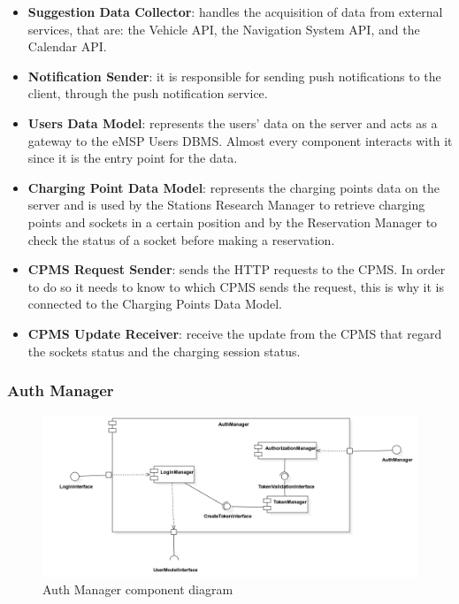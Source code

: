 \documentclass{Configuration_Files/PoliMi3i_thesis}
\begin{document}
\begin{itemize}
    \item \textbf{Suggestion Data Collector}: handles the acquisition of data from external services, that are: the Vehicle API, the Navigation System API, and the Calendar API.
    \item \textbf{Notification Sender}: it is responsible for sending push notifications to the client, through the push notification service.
    \item \textbf{Users Data Model}: represents the users' data on the server and acts as a gateway to the eMSP Users DBMS. Almost every component interacts with it since it is the entry point for the data.
    \item \textbf{Charging Point Data Model}: represents the charging points data on the server and is used by the Stations Research Manager to retrieve charging points and sockets in a certain position and by the Reservation Manager to check the status of a socket before making a reservation.
    \item \textbf{CPMS Request Sender}: sends the HTTP requests to the CPMS. In order to do so it needs to know to which CPMS sends the request, this is why it is connected to the Charging Points Data Model.
    \item \textbf{CPMS Update Receiver}: receive the update from the CPMS that regard the sockets status and the charging session status.
\end{itemize}

\subsubsection{Auth Manager}

\begin{figure}[H]
    \centering
    \includegraphics[width=1\textwidth]{Images/component/AuthManager.jpg}
    \caption{Auth Manager component diagram}
\end{figure}
\end{document}
